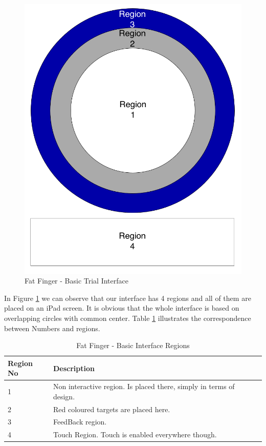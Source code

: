  \begin{figure}[H]
\centering
\includegraphics[scale=0.3]{figures/FFBasicTrialInterface.png}
\caption{Fat Finger - Basic Trial Interface}
\label{fig:FFBasicTrialInterface}
\end{figure}

In Figure \ref{fig:FFBasicTrialInterface} we can observe that our interface has 4 regions and all of them are placed on an iPad screen. It is obvious that the whole interface is based on overlapping circles with common center. Table \ref{tab:ffRegions} illustrates the correspondence between Numbers and regions.

\begin{table}[H]
\centering
\begin{tabular}{l || l }
Region No & Description \\
\hline
1 &  Non interactive region. Is placed there, simply in terms of design.\\
2 &  Red coloured targets are placed here.\\
3 &  FeedBack region.\\
4 &  Touch Region. Touch is enabled everywhere though.
\end{tabular}
\caption{Fat Finger - Basic Interface Regions}
\label{tab:ffRegions}
\end{table}

